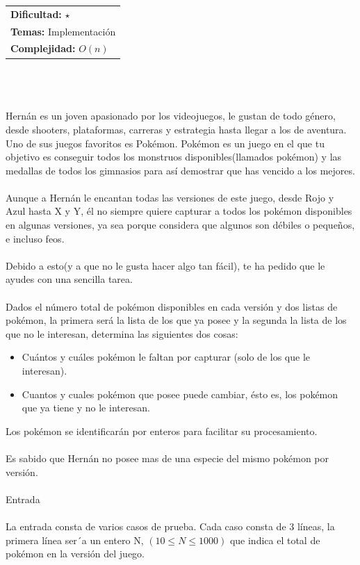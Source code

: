 \documentclass[12pt]{article}
\begin{document}
\hfill
\begin{tabular}{@{}l@{}}
\textbf{Dificultad:} $\star$ \\
\textbf{Temas:} Implementación \\
\textbf{Complejidad:} $O(n)$
\end{tabular}\\
\\
\\
Hernán es un joven apasionado por los videojuegos, le gustan de todo género, desde shooters, plataformas, carreras y estrategia hasta llegar a los de aventura. Uno de sus juegos favoritos es Pokémon. Pokémon es un juego en el que tu objetivo es conseguir todos los monstruos disponibles(llamados pokémon) y las medallas de todos los gimnasios para así demostrar que has vencido a los mejores.\\
\\Aunque a Hernán le encantan todas las versiones de este juego, desde Rojo y Azul hasta X y Y, él no siempre quiere capturar a todos los pokémon disponibles en algunas versiones, ya sea porque considera que algunos son débiles o pequeños, e incluso feos.\\
\\Debido a esto(y a que no le gusta hacer algo tan fácil), te ha pedido que le ayudes con una sencilla tarea.\\ \\Dados el número total de pokémon disponibles en cada versión y dos listas de pokémon, la primera será la lista de los que ya posee y la segunda la lista de los que no le interesan, determina las siguientes dos cosas:
\begin{itemize}
\item Cuántos y cuáles pokémon le faltan por capturar (solo de los que le interesan).
\item Cuantos y cuales pokémon que posee puede cambiar, ésto es, los pokémon que ya tiene y no le interesan.
\end{itemize}
Los pokémon se identificarán por enteros para facilitar su procesamiento.\\
\\Es sabido que Hernán no posee mas de una especie del mismo pokémon por versión.\\
\\
\textrm{\large Entrada}
\\
\\La entrada consta de varios casos de prueba.
Cada caso consta de 3 líneas, la primera línea ser´a un entero N, $(10 ≤ N ≤ 1000)$ que indica el total de pokémon en la versión del juego.\\
\end{document}
